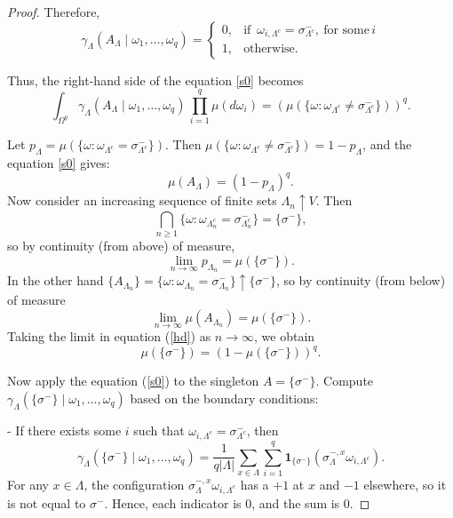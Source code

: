 \documentclass[11pt,reqno]{amsart}
\numberwithin{equation}{section} \setcounter{tocdepth}{1}
\begin{document}
\begin{proof}
Therefore,
$$
\gamma_\Lambda(A_\Lambda \mid \omega_1, \dots, \omega_q) = 
\begin{cases}
0, & \text{if } \, \omega_{i,\Lambda^c} = \sigma^-_{\Lambda^c}, \ \text{for some} \, i \\
1, & \text{otherwise}.
\end{cases}
$$

Thus, the right-hand side of the equation \eqref{s0} becomes
$$\int_{\Omega^q} \gamma_\Lambda(A_\Lambda \mid \omega_1, \dots, \omega_q) \, \prod_{i=1}^q\mu(d\omega_i)
  = \left( \mu( \{ \omega : \omega_{\Lambda^c} \neq \sigma^-_{\Lambda^c} \} ) \right)^q.
$$

Let $p_\Lambda = \mu( \{ \omega : \omega_{\Lambda^c} = \sigma^-_{\Lambda^c} \} )$. Then $\mu( \{ \omega : \omega_{\Lambda^c} \neq \sigma^-_{\Lambda^c} \} ) = 1 - p_\Lambda$, and the equation \eqref{s0} gives:
\begin{equation}\label{hd}
\mu(A_\Lambda) = (1 - p_\Lambda)^q. 
\end{equation}
Now consider an increasing sequence of finite sets $\Lambda_n \uparrow V$. Then
$$\bigcap_{n\geq 1}\{ \omega : \omega_{\Lambda_n^c} = \sigma^-_{\Lambda_n^c} \} = \{ \sigma^- \},$$  
  so by continuity (from above) of measure,  
  $$
  \lim_{n \to \infty} p_{\Lambda_n} = \mu(\{\sigma^-\}).
  $$
 In the other hand $\{ A_{\Lambda_n} \} = \{ \omega : \omega_{\Lambda_n} = \sigma^-_{\Lambda_n} \} \uparrow \{ \sigma^- \}$,  
  so  by continuity (from below) of measure
  $$
  \lim_{n \to \infty} \mu(A_{\Lambda_n}) = \mu(\{\sigma^-\}).
  $$
Taking the limit in equation (\ref{hd}) as $n \to \infty$, we obtain
\begin{equation}\label{oo}
\mu(\{\sigma^-\}) = (1 - \mu(\{\sigma^-\}))^q. 
\end{equation}
  
Now apply the equation (\ref{s0}) to the singleton $A = \{\sigma^-\}$. Compute $\gamma_\Lambda(\{\sigma^-\} \mid \omega_1, \dots, \omega_q)$ based on the boundary conditions:

- If there exists some $i$ such that $\omega_{i,\Lambda^c} = \sigma^-_{\Lambda^c}$, then
  $$
  \gamma_\Lambda(\{\sigma^-\} \mid \omega_1, \dots, \omega_q) = \frac{1}{q|\Lambda|} \sum_{x \in \Lambda} \sum_{i=1}^q \mathbf{1}_{\{\sigma^-\}}(\sigma_\Lambda^{-,x} \omega_{i,\Lambda^c}).
  $$
  For any $x \in \Lambda$, the configuration $\sigma_\Lambda^{-,x} \omega_{i,\Lambda^c}$ has a $+1$ at $x$ and $-1$ elsewhere, so it is not equal to $\sigma^-$. Hence, each indicator is 0, and the sum is 0.


\end{proof}
\end{document}
